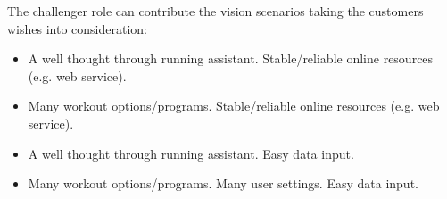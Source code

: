 The challenger role can contribute the vision scenarios taking the customers wishes into consideration:

\begin{itemize}
\item A well thought through running assistant. Stable/reliable online resources (e.g. web service).%
\item Many workout options/programs. Stable/reliable online resources (e.g. web service). %
\item A well thought through running assistant. Easy data input.  %
\item Many workout options/programs. Many user settings. Easy data input.  %
\end{itemize}